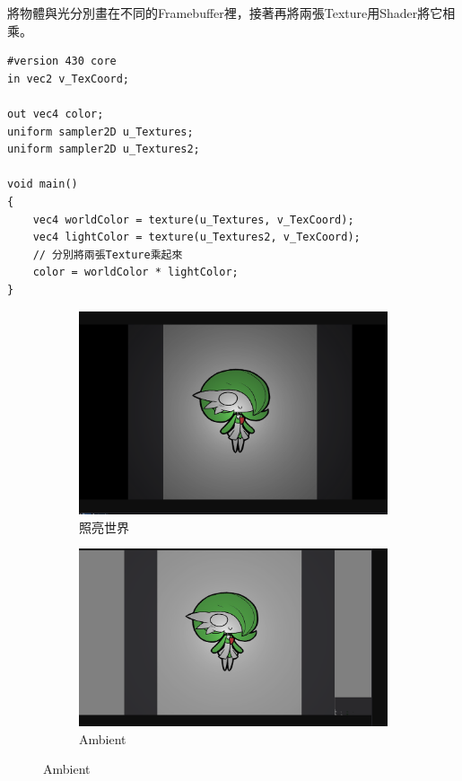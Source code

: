 將物體與光分別畫在不同的Framebuffer裡，接著再將兩張Texture用Shader將它相乘。

\begin{lstlisting}
#version 430 core
in vec2 v_TexCoord;

out vec4 color;
uniform sampler2D u_Textures;
uniform sampler2D u_Textures2;

void main()
{
    vec4 worldColor = texture(u_Textures, v_TexCoord);
    vec4 lightColor = texture(u_Textures2, v_TexCoord);
    // 分別將兩張Texture乘起來
    color = worldColor * lightColor;
}
\end{lstlisting}

\begin{figure}[h]
    \begin{subfigure}[b]{0.5\linewidth}
        \includegraphics[width=\linewidth]{./resources/2D-Lighting/Light.png} 
        \caption{照亮世界}
    \end{subfigure}
    \begin{subfigure}[b]{0.5\linewidth}
        \includegraphics[width=\linewidth]{./resources/2D-Lighting/Ambient.png}
        \caption{Ambient}
    \end{subfigure}
\label{fig:Light}
\end{figure}

